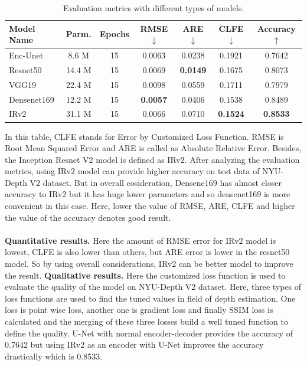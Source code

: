 \documentclass[a4paper,12pt,oneside]{book}
\begin{document}
\begin{table}
  \centering
  \caption{Evaluation metrics with different types of models.}
  \begin{tabular}{lcccccc}
    \toprule
    \textbf{Model Name} & \textbf{Parm.} & \textbf{Epochs} & \textbf{RMSE} $\downarrow$ & \textbf{ARE} $\downarrow$ & \textbf{CLFE} $\downarrow$ & \textbf{Accuracy} $\uparrow$ \\
    \midrule
    Enc-Unet & 8.6 M & 15 & 0.0063 & 0.0238 & 0.1921 & 0.7642 \\
    Resnet50 & 14.4 M & 15 & 0.0069 & \textbf{0.0149} & 0.1675 & 0.8073 \\
    VGG19 & 22.4 M & 15 & 0.0098 & 0.0559 & 0.1711 & 0.7979 \\
    Densenet169 & 12.2 M & 15 & \textbf{0.0057} & 0.0406 & 0.1538 & 0.8489 \\
    IRv2 & 31.1 M & 15 & 0.0066 & 0.0710 & \textbf{0.1524} & \textbf{0.8533} \\
    \bottomrule
  \end{tabular}
  
  \label{tab:evaluation}
\end{table}
In this table, CLFE stands for Error by Customized Loss Function. RMSE is Root Mean Squared Error and ARE is called as Absolute Relative Error. Besides, the Inception Resnet V2 model is defined as IRv2. After analyzing the evaluation metrics, using IRv2 model can provide higher accuracy on test data of NYU-Depth V2 dataset. But in overall cosideration, Densene169 has almost closer accuracy to IRv2 but it has huge lower parameters and so densenet169 is more convenient in this case. Here, lower the value of RMSE, ARE, CLFE and higher the value of the accuracy denotes good result.\\\\
\textbf{Quantitative results.} Here the amount of RMSE error for IRv2 model is lowest, CLFE is also lower than others, but ARE error is lower in the resnet50 model. So by using overall considerations, IRv2 can be better model to improve the result. \textbf{Qualitative results.} Here the customized loss function is used to evaluate the quality of the model on NYU-Depth V2 dataset. Here, three types of loss functions are used to find the tuned values in field of depth estimation. One loss is point wise loss, another one is gradient loss and finally SSIM loss is calculated and the merging of these three losses build a well tuned function to define the quality. U-Net with normal encoder-decoder provides the accuracy of 0.7642 but using IRv2 as an encoder with U-Net improves the accuracy drastically which is 0.8533.
\end{document}
